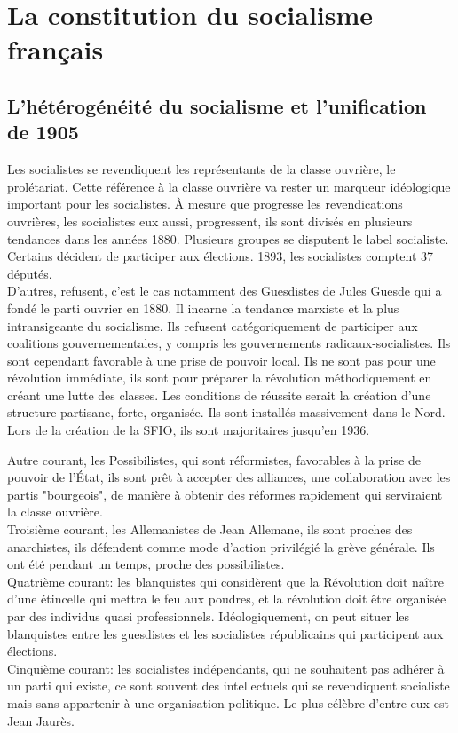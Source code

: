 \documentclass[10pt, a4paper, openany]{book}
\begin{document}
\section{La constitution du socialisme français}

\subsection{L'hétérogénéité du socialisme et l'unification de 1905}

Les socialistes se revendiquent les représentants de la classe ouvrière, le prolétariat. Cette référence à la classe ouvrière va rester un marqueur idéologique important pour les socialistes. À mesure que progresse les revendications ouvrières, les socialistes eux aussi, progressent, ils sont divisés en plusieurs tendances dans les années 1880. Plusieurs groupes se disputent le label socialiste. Certains décident de participer aux élections. 1893, les socialistes comptent 37 députés. \\
D'autres, refusent, c'est le cas notamment des Guesdistes de Jules Guesde qui a fondé le parti ouvrier en 1880. Il incarne la tendance marxiste et la plus intransigeante du socialisme. Ils refusent catégoriquement de participer aux coalitions gouvernementales, y compris les gouvernements radicaux-socialistes. Ils sont cependant favorable à une prise de pouvoir local. Ils ne sont pas pour une révolution immédiate, ils sont pour préparer la révolution méthodiquement en créant une lutte des classes. Les conditions de réussite serait la création d'une structure partisane, forte, organisée. Ils sont installés massivement dans le Nord. Lors de la création de la SFIO, ils sont majoritaires jusqu'en 1936.


Autre courant, les Possibilistes, qui sont réformistes, favorables à la prise de pouvoir de l'État, ils sont prêt à accepter des alliances, une collaboration avec les partis "bourgeois", de manière à obtenir des réformes rapidement qui serviraient la classe ouvrière. \\
Troisième courant, les Allemanistes de Jean Allemane, ils sont proches des anarchistes, ils défendent comme mode d'action privilégié la grève générale. Ils ont été pendant un temps, proche des possibilistes. \\
Quatrième courant: les blanquistes qui considèrent que la Révolution doit naître d'une étincelle qui mettra le feu aux poudres, et la révolution doit être organisée par des individus quasi professionnels. Idéologiquement, on peut situer les blanquistes entre les guesdistes et les socialistes républicains qui participent aux élections. \\
Cinquième courant: les socialistes indépendants, qui ne souhaitent pas adhérer à un parti qui existe, ce sont souvent des intellectuels qui se revendiquent socialiste mais sans appartenir à une organisation politique. Le plus célèbre d'entre eux est Jean Jaurès. 
\end{document}
